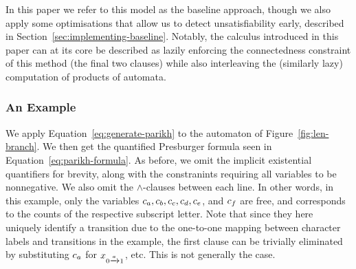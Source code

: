 \documentclass[acmsmall,review,anonymous]{acmart}\settopmatter{printfolios=true,printccs=false,printacmref=true}
\theoremstyle{definition}
\newif\ifoutline
\newcommand{\contents}[1]{\ifoutline{\color{blue}
    \begin{itemize}
    #1
    \end{itemize}
  }\fi}
\begin{document}
\contents{
  \item mention the bug here!
}

In this paper we refer to this model as the baseline approach, though we also
apply some optimisations that allow us to detect unsatisfiability early,
described in Section~\ref{sec:implementing-baseline}. Notably, the calculus
introduced in this paper can at its core be described as lazily enforcing the
connectedness constraint of this method (the final two clauses) while also
interleaving the (similarly lazy) computation of products of automata.

\subsubsection{An Example}
We apply Equation~\ref{eq:generate-parikh} to the automaton of Figure~\ref{fig:len-branch}. We then get the quantified Presburger formula seen in Equation~\ref{eq:parikh-formula}. As before, we omit the implicit existential quantifiers for brevity, along with the constranints requiring all variables to be nonnegative. We also omit the $\land$-clauses between each line. In other words, in this example, only the variables $c_a, c_b, c_c, c_d, c_e$, and $c_f$ are free, and corresponds to the counts of the respective subscript letter. Note that since they here uniquely identify a transition due to the one-to-one mapping between character labels and transitions in the example, the first clause can be trivially eliminated by substituting $c_a$ for $x_{0 \xrightarrow{a} 1}$, etc. This is not generally the case.
\end{document}

